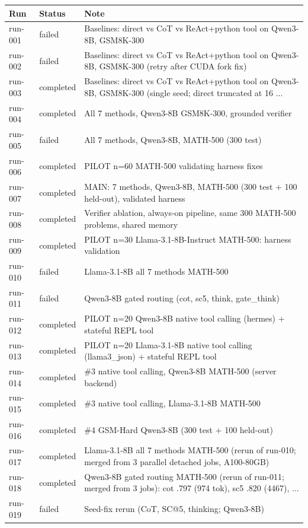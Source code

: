 \begin{tabular}{llp{10.5cm}}
\toprule
Run & Status & Note \\
\midrule
run-001 & failed & Baselines: direct vs CoT vs ReAct+python tool on Qwen3-8B, GSM8K-300 \\
run-002 & failed & Baselines: direct vs CoT vs ReAct+python tool on Qwen3-8B, GSM8K-300 (retry after CUDA fork fix) \\
run-003 & completed & Baselines: direct vs CoT vs ReAct+python tool on Qwen3-8B, GSM8K-300 (single seed; direct truncated at 16 ... \\
run-004 & completed & All 7 methods, Qwen3-8B GSM8K-300, grounded verifier \\
run-005 & failed & All 7 methods, Qwen3-8B, MATH-500 (300 test) \\
run-006 & completed & PILOT n=60 MATH-500 validating harness fixes \\
run-007 & completed & MAIN: 7 methods, Qwen3-8B, MATH-500 (300 test + 100 held-out), validated harness \\
run-008 & completed & Verifier ablation, always-on pipeline, same 300 MATH-500 problems, shared memory \\
run-009 & completed & PILOT n=30 Llama-3.1-8B-Instruct MATH-500: harness validation \\
run-010 & failed & Llama-3.1-8B all 7 methods MATH-500 \\
run-011 & failed & Qwen3-8B gated routing (cot, sc5, think, gate\_think) \\
run-012 & completed & PILOT n=20 Qwen3-8B native tool calling (hermes) + stateful REPL tool \\
run-013 & completed & PILOT n=20 Llama-3.1-8B native tool calling (llama3\_json) + stateful REPL tool \\
run-014 & completed & \#3 native tool calling, Qwen3-8B MATH-500 (server backend) \\
run-015 & completed & \#3 native tool calling, Llama-3.1-8B MATH-500 \\
run-016 & completed & \#4 GSM-Hard Qwen3-8B (300 test + 100 held-out) \\
run-017 & completed & Llama-3.1-8B all 7 methods MATH-500 (rerun of run-010; merged from 3 parallel detached jobs, A100-80GB) \\
run-018 & completed & Qwen3-8B gated routing MATH-500 (rerun of run-011; merged from 3 jobs): cot .797 (974 tok), sc5 .820 (4467), ... \\
run-019 & failed & Seed-fix rerun (CoT, SC@5, thinking; Qwen3-8B) \\

\end{tabular}
